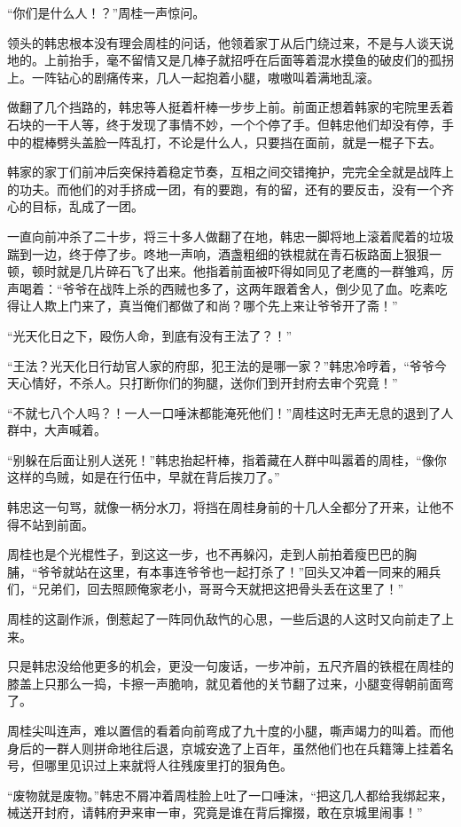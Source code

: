 “你们是什么人！？”周桂一声惊问。

领头的韩忠根本没有理会周桂的问话，他领着家丁从后门绕过来，不是与人谈天说地的。上前抬手，毫不留情又是几棒子就招呼在后面等着混水摸鱼的破皮们的孤拐上。一阵钻心的剧痛传来，几人一起抱着小腿，嗷嗷叫着满地乱滚。

做翻了几个挡路的，韩忠等人挺着杆棒一步步上前。前面正想着韩家的宅院里丢着石块的一干人等，终于发现了事情不妙，一个个停了手。但韩忠他们却没有停，手中的棍棒劈头盖脸一阵乱打，不论是什么人，只要挡在面前，就是一棍子下去。

韩家的家丁们前冲后突保持着稳定节奏，互相之间交错掩护，完完全全就是战阵上的功夫。而他们的对手挤成一团，有的要跑，有的留，还有的要反击，没有一个齐心的目标，乱成了一团。

一直向前冲杀了二十步，将三十多人做翻了在地，韩忠一脚将地上滚着爬着的垃圾踹到一边，终于停了步。咚地一声响，酒盏粗细的铁棍就在青石板路面上狠狠一顿，顿时就是几片碎石飞了出来。他指着前面被吓得如同见了老鹰的一群雏鸡，厉声喝着：“爷爷在战阵上杀的西贼也多了，这两年跟着舍人，倒少见了血。吃素吃得让人欺上门来了，真当俺们都做了和尚？哪个先上来让爷爷开了斋！”

“光天化日之下，殴伤人命，到底有没有王法了？！”

“王法？光天化日行劫官人家的府邸，犯王法的是哪一家？”韩忠冷哼着，“爷爷今天心情好，不杀人。只打断你们的狗腿，送你们到开封府去审个究竟！”

“不就七八个人吗？！一人一口唾沫都能淹死他们！”周桂这时无声无息的退到了人群中，大声喊着。

“别躲在后面让别人送死！”韩忠抬起杆棒，指着藏在人群中叫嚣着的周桂，“像你这样的鸟贼，如是在行伍中，早就在背后挨刀了。”

韩忠这一句骂，就像一柄分水刀，将挡在周桂身前的十几人全都分了开来，让他不得不站到前面。

周桂也是个光棍性子，到这这一步，也不再躲闪，走到人前拍着瘦巴巴的胸脯，“爷爷就站在这里，有本事连爷爷也一起打杀了！”回头又冲着一同来的厢兵们，“兄弟们，回去照顾俺家老小，哥哥今天就把这把骨头丢在这里了！”

周桂的这副作派，倒惹起了一阵同仇敌忾的心思，一些后退的人这时又向前走了上来。

只是韩忠没给他更多的机会，更没一句废话，一步冲前，五尺齐眉的铁棍在周桂的膝盖上只那么一捣，卡擦一声脆响，就见着他的关节翻了过来，小腿变得朝前面弯了。

周桂尖叫连声，难以置信的看着向前弯成了九十度的小腿，嘶声竭力的叫着。而他身后的一群人则拼命地往后退，京城安逸了上百年，虽然他们也在兵籍簿上挂着名号，但哪里见识过上来就将人往残废里打的狠角色。

“废物就是废物。”韩忠不屑冲着周桂脸上吐了一口唾沫，“把这几人都给我绑起来，械送开封府，请韩府尹来审一审，究竟是谁在背后撺掇，敢在京城里闹事！”

